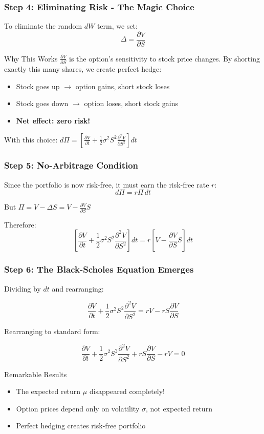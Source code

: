 \documentclass{beamer}
\begin{document}
\begin{frame}
\frametitle{Step 4: Eliminating Risk - The Magic Choice}
To eliminate the random $dW$ term, we set:
$$\Delta = \frac{\partial V}{\partial S}$$

\begin{block}{Why This Works}
$\frac{\partial V}{\partial S}$ is the option's sensitivity to stock price changes. By shorting exactly this many shares, we create perfect hedge:
\begin{itemize}
\item Stock goes up $\rightarrow$ option gains, short stock loses
\item Stock goes down $\rightarrow$ option loses, short stock gains
\item \textbf{Net effect: zero risk!}
\end{itemize}
\end{block}

With this choice: $d\Pi = \left[\frac{\partial V}{\partial t} + \frac{1}{2}\sigma^2 S^2 \frac{\partial^2 V}{\partial S^2}\right] dt$
\end{frame}

\begin{frame}
\frametitle{Step 5: No-Arbitrage Condition}
Since the portfolio is now risk-free, it must earn the risk-free rate $r$:
$$d\Pi = r\Pi \, dt$$

But $\Pi = V - \Delta S = V - \frac{\partial V}{\partial S}S$

Therefore:
$$\left[\frac{\partial V}{\partial t} + \frac{1}{2}\sigma^2 S^2 \frac{\partial^2 V}{\partial S^2}\right] dt = r\left[V - \frac{\partial V}{\partial S}S\right] dt$$
\end{frame}

\begin{frame}
\frametitle{Step 6: The Black-Scholes Equation Emerges}
Dividing by $dt$ and rearranging:

$$\frac{\partial V}{\partial t} + \frac{1}{2}\sigma^2 S^2 \frac{\partial^2 V}{\partial S^2} = rV - rS\frac{\partial V}{\partial S}$$

Rearranging to standard form:

$$\frac{\partial V}{\partial t} + \frac{1}{2}\sigma^2 S^2 \frac{\partial^2 V}{\partial S^2} + rS\frac{\partial V}{\partial S} - rV = 0$$

\begin{block}{Remarkable Results}
\begin{itemize}
\item The expected return $\mu$ disappeared completely!
\item Option prices depend only on volatility $\sigma$, not expected return
\item Perfect hedging creates risk-free portfolio
\end{itemize}
\end{block}
\end{frame}
\end{document}
